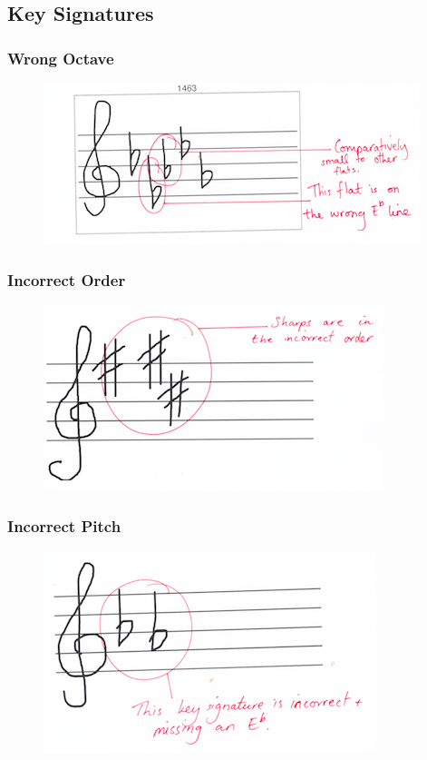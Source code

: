 \subsection{Key Signatures}

\subsubsection{Wrong Octave}\label{sec:tf-keysig-octave}

\begin{figure}[H]
  \centering
  \includegraphics[width=.6\linewidth]{gfx/teacher-notes/mistake-accidental-wrong-octave.png}
  \caption{}
\end{figure}

\subsubsection{Incorrect Order}\label{sec:tf-keysig-order}

\begin{figure}[H]
  \centering
  \includegraphics[width=.6\linewidth]{gfx/teacher-notes/mistake-keysig-order.png}
  \caption{}
\end{figure}

\subsubsection{Incorrect Pitch}\label{sec:tf-keysig-incorrect}

\begin{figure}[H]
  \centering
  \includegraphics[width=.6\linewidth]{gfx/teacher-notes/mistake-keysignature.png}
  \caption{}
\end{figure}

